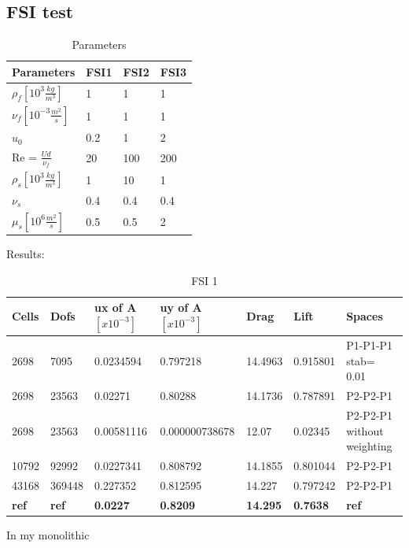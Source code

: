 \subsection*{FSI test}
\begin{table}[ht]
\centering
\caption{Parameters}
\label{my-label}
\begin{tabular}{|l|l|l|l|}
\hline
Parameters & FSI1 & FSI2 & FSI3 \\ \hline
$\rho_f[10^3 \frac{kg}{m^3}]$ & 1 & 1 & 1 \\ \hline
$\nu_f [10^{-3} \frac{m^2}{s}]$ & 1 & 1 & 1 \\ \hline
$u_0$ & 0.2 & 1 & 2 \\ \hline
Re = $\frac{U d}{\nu_f}$ & 20 & 100 & 200 \\ \hline
$\rho_s[10^3 \frac{kg}{m^3}]$ & 1 & 10 & 1 \\ \hline
$\nu_s$ & 0.4 & 0.4 & 0.4 \\ \hline
$\mu_s[10^6 \frac{m^2}{s}]$ & 0.5 & 0.5 & 2 \\ \hline
\end{tabular}
\end{table}
Results: 
\begin{table}[h]
\centering
\caption{FSI 1}
\label{my-label}
\begin{tabular}{|l|l|l|l|l|l|l|}
\hline
Cells & Dofs & ux of A $[x10^{-3}]$ & uy of A $[x10^{-3}]$ & Drag & Lift & Spaces \\ \hline
2698 & 7095 & 0.0234594 & 0.797218  & 14.4963 & 0.915801 & P1-P1-P1 stab= 0.01 \\ \hline
2698 & 23563 & 0.02271 & 0.80288 & 14.1736 & 0.787891 & P2-P2-P1 \\ \hline
2698 & 23563 & 0.00581116 & 0.000000738678  & 12.07 & 0.02345 & P2-P2-P1 without weighting \\ \hline
10792 & 92992 & 0.0227341 & 0.808792 & 14.1855 & 0.801044 & P2-P2-P1 \\ \hline
43168 & 369448 & 0.227352 & 0.812595 & 14.227 & 0.797242 & P2-P2-P1 \\ \hline
\textbf{ref} & \textbf{ref} & \textbf{0.0227} & \textbf{0.8209} & \textbf{14.295} & \textbf{0.7638} & \textbf{ref} \\ \hline
\end{tabular}
\end{table}
In my monolithic 



